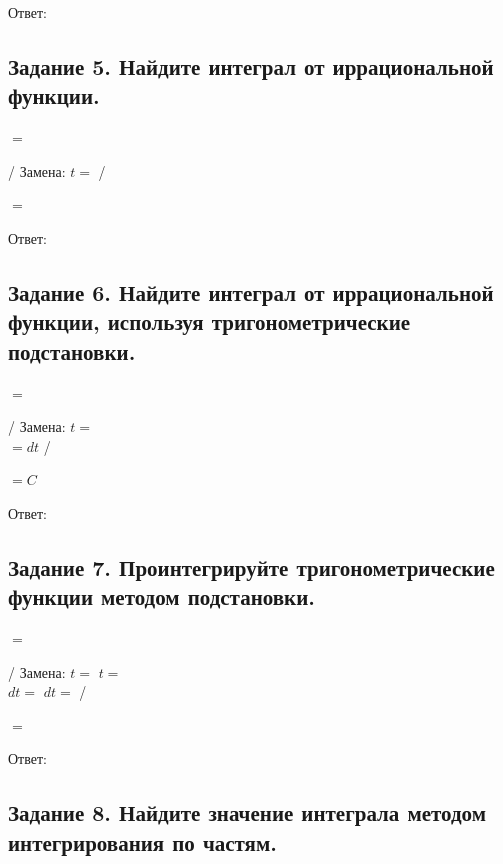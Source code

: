 \documentclass[12pt]{article}
\begin{document}
Ответ: $ $

\subsection*{Задание 5. Найдите интеграл от иррациональной функции.}

$=$\vspace{2.5mm}

/ Замена: $t=$ /\vspace{2.5mm}

$=$\vspace{2.5mm}

Ответ: $ $

\subsection*{Задание 6. Найдите интеграл от иррациональной функции, используя
тригонометрические подстановки.}

$=$\vspace{2.5mm}

/ Замена: $t=$ \vspace{2.5mm}\\
$=dt$ /\vspace{2.5mm}

$=C$\vspace{2.5mm}

Ответ: $ $

\subsection*{Задание 7. Проинтегрируйте тригонометрические функции методом
подстановки.}

$=$\vspace{2.5mm}

/ Замена: $t= $  \hspace{2.5mm}  $t=$ \vspace{2.5mm}\\
$dt=$ \hspace{2.5mm} $dt=$ /\vspace{2.5mm}

$=$\vspace{2.5mm}

Ответ: $ $

\subsection*{Задание 8. Найдите значение интеграла методом интегрирования по частям.}
\end{document}
